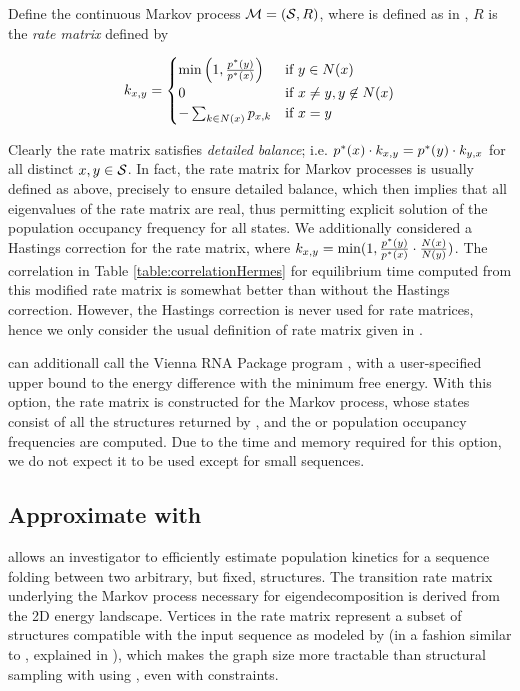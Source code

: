 Define the continuous Markov process
$\mathcal{M}=(\mathcal S,R)$, where \str is defined as in
, $R$ is the {\em rate matrix} defined by

\begin{align}
\label{eq:hermes:xitionRateWithoutHastings}
k_{x,y}=
\begin{cases}
\min\left(1, \frac{\pSt(y)}{\pSt(x)}\right)
& \text{if $y \in N(x)$} \\
0 &\text{if $x \ne y, y \not\in N(x)$} \\
- \sum_{k \in N(x)} p_{x,k} & \text{if $x=y$} \\
\end{cases}
\end{align}

Clearly the rate matrix satisfies {\em detailed balance}; i.e. $p^*(x)
\cdot k_{x,y} = p^*(y) \cdot k_{y,x}$ for all distinct $x,y \in
\mathcal S$. In fact, the rate matrix for Markov processes is usually
defined as above, precisely to ensure detailed balance, which then
implies that all eigenvalues of the rate matrix are real, thus
permitting explicit solution of the population occupancy frequency for
all states. We additionally considered a Hastings correction
for the rate matrix, where $k_{x,y} = \min(1, \frac{p^*(y)}{p^*(x)}
\cdot \frac{N(x)}{N(y)})$. The correlation in
Table \ref{table:correlationHermes} for equilibrium time computed from this
modified rate matrix is somewhat better than without the Hastings
correction. However, the Hastings correction is never used for rate
matrices, hence we only consider the usual definition of rate matrix
given in .

\rnaeq can additionall call the
Vienna RNA Package program \rnasub \citep{wuchty.b99}, with a
user-specified upper bound to the energy difference with the minimum
free energy. With this option, the rate matrix is
constructed for the Markov process, whose states consist of all
the structures returned by \rnasub, and the \eqt or
population occupancy frequencies are computed. Due to the time
and memory required for this option, we do not expect it to be used except for
small sequences.

\subsection{Approximate \eqt with \ffteq}
\label{subsec:hermes:ffteq}

\ffteq allows an investigator to efficiently estimate population
kinetics for a sequence folding between two arbitrary, but fixed,
structures. The transition rate matrix underlying the Markov process
necessary for eigendecomposition is derived from the 2D energy
landscape. Vertices in the rate matrix represent a subset of
structures compatible with the input sequence as modeled by
\ffttwo (in a fashion similar to \fftmfpt, explained in
), which makes the graph size more tractable
than structural
sampling with \rnasub using \rnaeq, even with constraints.

